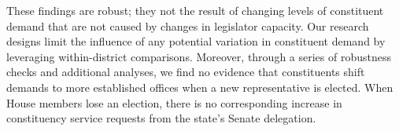 \documentclass[12pt]{article}
\begin{document}








 

These findings are robust; they not the result of changing levels of constituent demand that are not caused by changes in legislator capacity. Our research designs limit the influence of any potential variation in constituent demand by leveraging within-district comparisons.  
Moreover, through a series of robustness checks and additional analyses, we find no evidence that constituents shift demands to more established offices when a new representative is elected. When House members lose an election, there is no corresponding increase in constituency service requests from the state's Senate delegation. 
\end{document}
